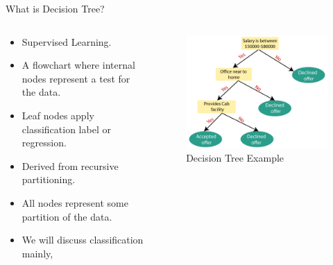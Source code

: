 \documentclass[xcolor={svgnames},
               hyperref={colorlinks,citecolor=DeepPink4,linkcolor=FireBrick,urlcolor=Maroon}]
               {beamer}
\begin{document}
\begin{frame}{What is Decision Tree?}
    \begin{columns}[T]
      \begin{column}{.60\textwidth}
        \begin{center}
        \begin{itemize}
            \item Supervised Learning.  
            \item A flowchart where internal nodes represent a test for the data.
            \item Leaf nodes apply classification label or regression.
            \item Derived from recursive partitioning. 
            \item All nodes represent some partition of the data.
            \item We will discuss classification mainly, 
        \end{itemize}
      \end{center}
      \end{column}
      \begin{column}{.50\textwidth}
            \begin{figure}
              \vspace*{\fill}
              \begin{center}
            \includegraphics[width=.75\textwidth]{ExampleTree.png}
          \caption{Decision Tree Example}
              \end{center}
              \vspace*{\fill}
            \end{figure}
          \end{column}
    \end{columns}
  \end{frame}
\end{document}
